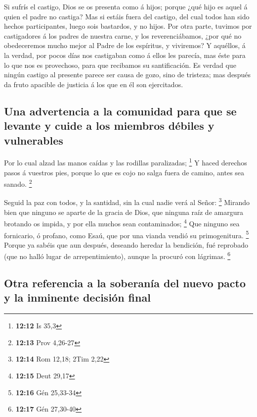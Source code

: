  Si sufrís el castigo, Dios se os presenta como á hijos;
porque ¿qué hijo es aquel á quien el padre no castiga? 
Mas si estáis fuera del castigo, del cual todos han sido hechos
participantes, luego sois bastardos, y no hijos.  Por otra
parte, tuvimos por castigadores á los padres de nuestra carne, y los
reverenciábamos, ¿por qué no obedeceremos mucho mejor al Padre de los
espíritus, y viviremos?  Y aquéllos, á la verdad, por
pocos días nos castigaban como á ellos les parecía, mas éste para lo que
nos es provechoso, para que recibamos su santificación. 
Es verdad que ningún castigo al presente parece ser causa de gozo, sino
de tristeza; mas después da fruto apacible de justicia á los que en él
son ejercitados.

\hypertarget{una-advertencia-a-la-comunidad-para-que-se-levante-y-cuide-a-los-miembros-duxe9biles-y-vulnerables}{%
\subsection{Una advertencia a la comunidad para que se levante y cuide a
los miembros débiles y
vulnerables}\label{una-advertencia-a-la-comunidad-para-que-se-levante-y-cuide-a-los-miembros-duxe9biles-y-vulnerables}}

 Por lo cual alzad las manos caídas y las rodillas
paralizadas; \footnote{\textbf{12:12} Is 35,3}  Y haced
derechos pasos á vuestros pies, porque lo que es cojo no salga fuera de
camino, antes sea sanado. \footnote{\textbf{12:13} Prov 4,26-27}

 Seguid la paz con todos, y la santidad, sin la cual
nadie verá al Señor: \footnote{\textbf{12:14} Rom 12,18; 2Tim 2,22}
 Mirando bien que ninguno se aparte de la gracia de Dios,
que ninguna raíz de amargura brotando os impida, y por ella muchos sean
contaminados; \footnote{\textbf{12:15} Deut 29,17}  Que
ninguno sea fornicario, ó profano, como Esaú, que por una vianda vendió
su primogenitura. \footnote{\textbf{12:16} Gén 25,33-34} 
Porque ya sabéis que aun después, deseando heredar la bendición, fué
reprobado (que no halló lugar de arrepentimiento), aunque la procuró con
lágrimas. \footnote{\textbf{12:17} Gén 27,30-40}

\hypertarget{otra-referencia-a-la-soberanuxeda-del-nuevo-pacto-y-la-inminente-decisiuxf3n-final}{%
\subsection{Otra referencia a la soberanía del nuevo pacto y la
inminente decisión
final}\label{otra-referencia-a-la-soberanuxeda-del-nuevo-pacto-y-la-inminente-decisiuxf3n-final}}

